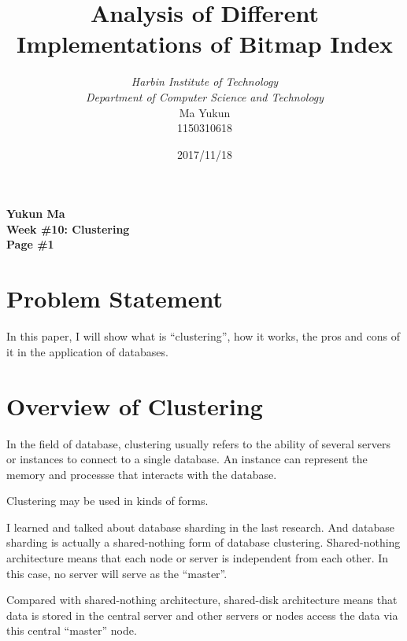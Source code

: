 \documentclass[12pt, a4paper]{article}
\begin{document}
\title{{\bf\Huge Analysis of Different Implementations of Bitmap Index}}
\author{\emph{Harbin Institute of Technology}\\\emph{Department of Computer Science and Technology}\\Ma Yukun\\1150310618}

\date{2017/11/18}

\nocite{*}


\begin{center}
{\textbf{
Yukun Ma\\
Week \#10: Clustering\\
Page \#1}}
\end{center}

\section{Problem Statement}

In this paper, I will show what is ``clustering'', how it works, the pros and cons of it in the application of databases.




\section{Overview of Clustering}

In the field of database, clustering usually refers to the ability of several servers or instances to connect to a single database. An instance can represent the memory and processse that interacts with the database.\cite{techo}

Clustering may be used in kinds of forms.

I learned and talked about database sharding in the last research. And database sharding is actually a shared-nothing form of database clustering. Shared-nothing architecture means that each node or server is independent from each other. In this case, no server will serve as the ``master''.

Compared with shared-nothing architecture, shared-disk architecture means that data is stored in the central server and other servers or nodes access the data via this central ``master'' node.
\end{document}
